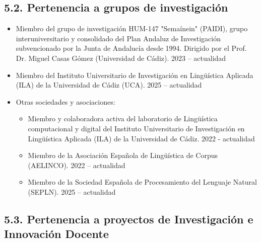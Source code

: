 \subsection*{5.2. Pertenencia a grupos de investigación}


\begin{itemize}

      \item Miembro del grupo de investigación HUM-147 "Semaínein" (PAIDI), grupo interuniversitario y consolidado del Plan Andaluz de Investigación subvencionado por la Junta de Andalucía desde 1994. Dirigido por el Prof. Dr. Miguel Casas Gómez (Universidad de Cádiz). \hfill 2023 -- actualidad
      
      \item Miembro del Instituto Universitario de Investigación en Lingüística Aplicada (ILA) de la Universidad de Cádiz (UCA). \hfill 2025 -- actualidad
      
      \item Otras sociedades y asociaciones:
      \begin{itemize}[label=\textbullet]
            \item Miembro y colaboradora activa del laboratorio de Lingüística computacional y digital del Instituto Universitario de Investigación en Lingüística Aplicada (ILA) de la Universidad de Cádiz. \hfill 2022 - actualidad
            \item Miembro de la Asociación Española de Lingüística de Corpus (AELINCO). \hfill 2022 -- actualidad
            \item Miembro de la Sociedad Española de Procesamiento del Lenguaje Natural (SEPLN). \hfill 2025 -- actualidad
        \end{itemize}
\end{itemize}

\subsection*{5.3. Pertenencia a proyectos de Investigación e Innovación Docente}



